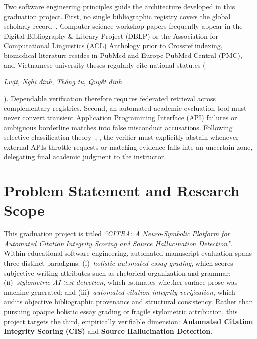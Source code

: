 Two software engineering principles guide the architecture developed in this graduation project. First, no single bibliographic registry covers the global scholarly record~\cite{visser2021bibliographic}. Computer science workshop papers frequently appear in the Digital Bibliography \& Library Project (DBLP) or the Association for Computational Linguistics (ACL) Anthology prior to Crossref indexing, biomedical literature resides in PubMed and Europe PubMed Central (PMC), and Vietnamese university theses regularly cite national statutes (\begin{vietnamese}\textit{Luật}, \textit{Nghị định}, \textit{Thông tư}, \textit{Quyết định}\end{vietnamese}). Dependable verification therefore requires federated retrieval across complementary registries. Second, an automated academic evaluation tool must never convert transient Application Programming Interface (API) failures or ambiguous borderline matches into false misconduct accusations. Following selective classification theory~\cite{chow1970optimum}, \cite{Geifman2017}, the verifier must explicitly abstain whenever external APIs throttle requests or matching evidence falls into an uncertain zone, delegating final academic judgment to the instructor.

\section{Problem Statement and Research Scope}

This graduation project is titled \textit{``CITRA: A Neuro-Symbolic Platform for Automated Citation Integrity Scoring and Source Hallucination Detection''}. Within educational software engineering, automated manuscript evaluation spans three distinct paradigms: (i)~\emph{holistic automated essay grading}, which scores subjective writing attributes such as rhetorical organization and grammar; (ii)~\emph{stylometric AI-text detection}, which estimates whether surface prose was machine-generated; and (iii)~\emph{automated citation integrity verification}, which audits objective bibliographic provenance and structural consistency. Rather than pursuing opaque holistic essay grading or fragile stylometric attribution, this project targets the third, empirically verifiable dimension: \textbf{Automated Citation Integrity Scoring (CIS)} and \textbf{Source Hallucination Detection}.

